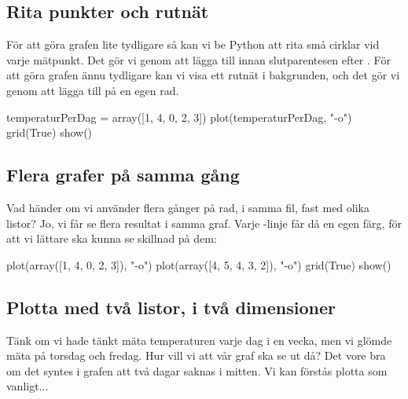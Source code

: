 
\subsection{Rita punkter och rutnät}

För att göra grafen lite tydligare så kan vi be Python att rita små cirklar vid varje mätpunkt. Det gör vi genom att lägga till  innan slutparentesen efter . För att göra grafen ännu tydligare kan vi visa ett rutnät i bakgrunden, och det gör vi genom att lägga till  på en egen rad.

\begin{python}[caption={Vår andra graf},label={}]
temperaturPerDag = array([1, 4, 0, 2, 3])
plot(temperaturPerDag, "-o")
grid(True)
show()
\end{python}


\subsection{Flera grafer på samma gång}

Vad händer om vi använder  flera gånger på rad, i samma fil, fast med olika listor? Jo, vi får se flera resultat i samma graf. Varje -linje får då en egen färg, för att vi lättare ska kunna se skillnad på dem:
\begin{python}[caption={Två grafer i en},label={}]
plot(array([1, 4, 0, 2, 3]), "-o")
plot(array([4, 5, 4, 3, 2]), "-o")
grid(True)
show()
\end{python}


\subsection{Plotta med två listor, i två dimensioner}\label{subsec:plottwodim}

Tänk om vi hade tänkt mäta temperaturen varje dag i en vecka, men vi glömde mäta på torsdag och fredag. Hur vill vi att vår graf ska se ut då? Det vore bra om det syntes i grafen att två dagar saknas i mitten. Vi kan förstås plotta som vanligt...

